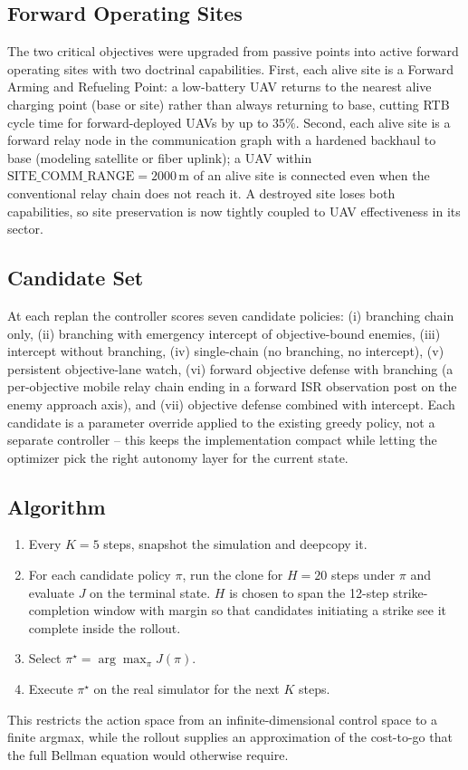 \documentclass[conference]{IEEEtran}
\begin{document}
\subsection{Forward Operating Sites}
The two critical objectives were upgraded from passive points into active
forward operating sites with two doctrinal capabilities. First, each alive
site is a Forward Arming and Refueling Point: a low-battery UAV returns to
the nearest alive charging point (base or site) rather than always returning
to base, cutting RTB cycle time for forward-deployed UAVs by up to $35\%$.
Second, each alive site is a forward relay node in the communication graph
with a hardened backhaul to base (modeling satellite or fiber uplink); a
UAV within $\text{SITE\_COMM\_RANGE} = 2000$\,m of an alive site is connected
even when the conventional relay chain does not reach it. A destroyed site
loses both capabilities, so site preservation is now tightly coupled to UAV
effectiveness in its sector.

\subsection{Candidate Set}
At each replan the controller scores seven candidate policies: (i) branching
chain only, (ii) branching with emergency intercept of objective-bound enemies,
(iii) intercept without branching, (iv) single-chain (no branching, no
intercept), (v) persistent objective-lane watch, (vi) forward objective
defense with branching (a per-objective mobile relay chain ending in a
forward ISR observation post on the enemy approach axis), and
(vii) objective defense combined with intercept. Each candidate is a parameter
override applied to the existing greedy policy, not a separate controller --
this keeps the implementation compact while letting the optimizer pick the
right autonomy layer for the current state.

\subsection{Algorithm}
\begin{enumerate}
\item Every $K=5$ steps, snapshot the simulation and deepcopy it.
\item For each candidate policy $\pi$, run the clone for $H=20$ steps under
      $\pi$ and evaluate $J$ on the terminal state. $H$ is chosen to span
      the 12-step strike-completion window with margin so that candidates
      initiating a strike see it complete inside the rollout.
\item Select $\pi^{\star} = \arg\max_\pi J(\pi)$.
\item Execute $\pi^{\star}$ on the real simulator for the next $K$ steps.
\end{enumerate}
This restricts the action space from an infinite-dimensional control space to a
finite argmax, while the rollout supplies an approximation of the cost-to-go
that the full Bellman equation would otherwise require.
\end{document}
